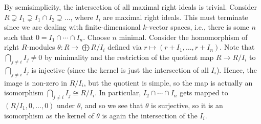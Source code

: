 By semisimplicity, the intersection of all maximal right ideals is trivial.
Consider
$R \supsetneq I_1 \supsetneq I_1\cap I_2\supsetneq\ldots$,
where $I_i$ are maximal right ideals. This must terminate since we are dealing
with finite-dimensional $k$-vector spaces, i.e., there is some $n$ such that
$0 = I_1\cap\cdots \cap I_n$. Choose $n$ minimal. Consider the homomorphism
of right $R$-modules $\theta\colon R\to \bigoplus R/I_i$ defined via
$r\mapsto (r+I_1, \ldots, r+I_n)$. Note that $\bigcap_{j\neq i} I_j\neq 0$ by
minimality and the restriction of the quotient map $R \to R/I_i$ to
$\bigcap_{j\neq i} I_j$ is injective (since the kernel is just the intersection
of all $I_i$). Hence, the image is non-zero in $R/I_i$, but the quotient is
simple, so the map is actually an isomorphism $\bigcap_{j\neq i} I_j\cong R/I_i$.
In particular, $I_2\cap\cdots\cap I_n$ gets mapped to
$(R/I_1, 0, \ldots, 0)$ under $\theta$, and so we see that $\theta$ is
surjective, so it is an isomorphism as the kernel of $\theta$ is again
the intersection of the $I_i$.
